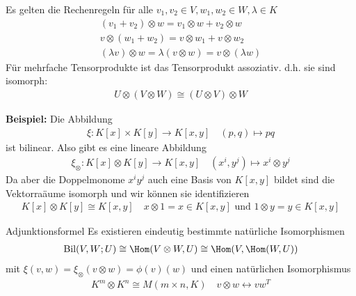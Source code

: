 Es gelten die Rechenregeln für alle $v_1,v_2 \in V, w_1, w_2 \in W, \lambda \in K$
\begin{align*}
    (v_1 + v_2) \otimes w = v_1 \otimes w + v_2 \otimes w\\
    v \otimes (w_1 + w_2) = v \otimes w_1 + v \otimes w_2\\
    (\lambda v) \otimes w = \lambda (v \otimes w) = v \otimes (\lambda w)
\end{align*}
Für mehrfache Tensorprodukte ist das Tensorprodukt assoziativ. d.h. sie sind isomorph:
\begin{align*}
    U \otimes (V \otimes W) \cong (U \otimes V) \otimes W 
\end{align*}

\textbf{Beispiel:} \quad Die Abbildung 
\begin{align*}
    \xi: K[x] \times K[y] \to K[x,y] \quad (p,q) \mapsto pq
\end{align*}
ist bilinear. Also gibt es eine lineare Abbildung
\begin{align*}
    \xi_{\otimes}: K[x] \otimes K[y] \to K[x,y] \quad (x^i, y^j) \mapsto x^i \otimes y^j
\end{align*}
Da aber die Doppelmonome $x^iy^j$ auch eine Basis von $K[x,y]$ bildet sind die Vektorraäume isomorph und wir können sie identifizieren
\begin{align*}
    K[x] \otimes K[y] \cong K[x,y] \quad x \otimes 1 = x \in K[x,y] \text{ und } 1 \otimes y = y \in K[x,y]
\end{align*}


\begin{proposition}{Adjunktionsformel}
    Es existieren eindeutig bestimmte natürliche Isomorphismen
    \begin{align*}
        \text{Bil}(V,W;U) \cong \Hom(V \otimes W,U) \cong \Hom(V, \Hom(W,U))
    \end{align*}
    mit $\xi(v,w) = \xi_{\otimes}(v \otimes w) = \phi(v)(w)$ und einen natürlichen Isomorphismus
    \begin{align*}
        K^m \otimes K^n \cong M(m\times n,K) \quad v \otimes w \longleftrightarrow vw^T
    \end{align*}
\end{proposition}

